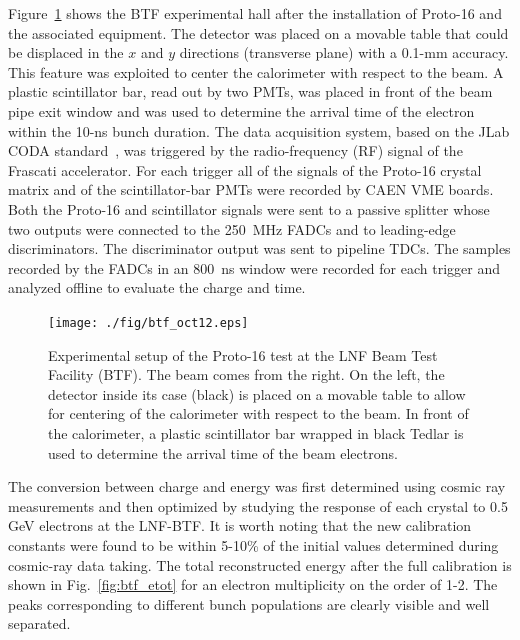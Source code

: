 Figure~\ref{fig:btf} shows the BTF experimental hall after the installation of Proto-16 and the associated equipment.
The detector was placed on a movable table that could be displaced in the $x$ and $y$ directions (transverse
plane) with a 0.1-mm accuracy. This feature was exploited to center the calorimeter with respect to the beam. A
plastic scintillator bar, read out by two PMTs, was placed in front of the beam pipe exit window and was used to
determine the arrival time of the electron within the 10-ns bunch duration. The data acquisition system, based on the
JLab CODA standard~\cite{daq}, was triggered by the radio-frequency (RF) signal of the Frascati accelerator. For
each trigger all of the signals of the Proto-16 crystal matrix and of the scintillator-bar PMTs were recorded by
CAEN VME boards. Both the Proto-16 and scintillator signals were sent to a passive splitter whose two outputs were
connected to the 250~MHz FADCs and to leading-edge discriminators. The discriminator output was sent to pipeline
TDCs. The samples recorded by the FADCs in an 800~ns window were recorded for each trigger and analyzed offline
to evaluate the charge and time.

\begin{figure}
\texttt{[image: ./fig/btf\_oct12.eps]}
\caption{Experimental setup of the Proto-16 test at the LNF Beam Test Facility (BTF). The beam comes from the right.
  On the left, the detector inside its case (black) is placed on a movable table to allow for centering of the calorimeter
  with respect to the beam. In front of the calorimeter, a plastic scintillator bar wrapped in black Tedlar is used to
  determine the arrival time of the beam electrons.}
\label{fig:btf}
\end{figure}

The conversion between charge and energy was first determined using cosmic ray measurements and then optimized
by studying the response of each crystal to 0.5 GeV electrons at the LNF-BTF. It is worth noting that the new
calibration constants were found to be within 5-10\% of the initial values determined during cosmic-ray data
taking. The total reconstructed energy  after the full calibration is shown in Fig.~\ref{fig:btf_etot} for an electron
multiplicity on the order of 1-2. The peaks corresponding to different bunch populations are clearly visible and well
separated. 

